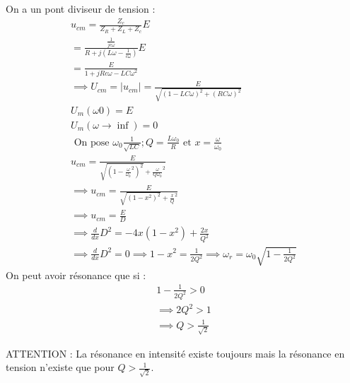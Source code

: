 On a un pont diviseur de tension : 
\begin{eqnarray*}
    u_{cm} = \frac{Z_{c}}{Z_{R} + Z_{L} + Z_{c}}E \\
    = \frac{\frac{1}{jc \omega }}{R + j (L \omega -\frac{1}{c \omega })} E \\
    = \frac{E}{1 + jRc \omega  -LC \omega^{2}} \\
    \implies U_{cm} = \lvert u_{cm} \rvert = \frac{E}{\sqrt{(1-LC \omega)^{2} + (RC \omega )^{2}}} \\
    U_{m}( \omega0) = E \\
    U_{m} ( \omega \to \inf ) = 0 \\
    \text{ On pose } \omega_{0} \frac{1}{\sqrt{LC}} ; Q = \frac{L \omega_{0}}{R} \text{ et } x = \frac{\omega }{\omega _{0}} \\
    u_{cm} = \frac{E}{\sqrt{(1- \frac{\omega }{\omega _{0}}^{2})^{2}} + \frac{\omega }{Q \omega _{0}}^{2}} \\
    \implies u_{cm} = \frac{E}{\sqrt{(1-x^{2})^{2}}+ \frac{x}{Q}^{2}} \\
    \implies u_{cm} = \frac{E}{D} \\
    \implies \frac{d}{dx}D^{2} = -4x (1-x^{2}) + \frac{2x}{Q^{2}}\\
    \implies \frac{d}{dx}D^{2} = 0 \implies 1-x^{2} = \frac{1}{2Q^{2}} \implies \omega_{r} = \omega_{0} \sqrt{1-\frac{1}{2Q^{2}}}
\end{eqnarray*}
On peut avoir résonance que si : 
\begin{eqnarray*}
    1-\frac{1}{2Q^{2}} >0 \\
    \implies 2Q^{2} >1 \\
    \implies Q > \frac{1}{\sqrt{2}}
\end{eqnarray*}

\begin{remark}
    ATTENTION : La résonance en intensité existe toujours mais la résonance en tension n'existe que pour \(Q > \frac{1}{\sqrt{2}}\).  
\end{remark}
